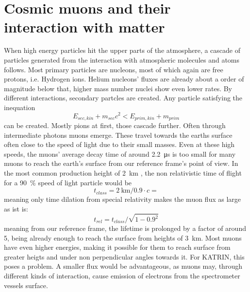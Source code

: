     \section{Cosmic muons and their interaction with matter}
    \label{ch:introduction:sec:Cosmic Air Showers}
    When high energy particles hit the upper parts of the atmosphere, a cascade of particles generated from the interaction with atmospheric molecules and atoms follows. Most primary particles are nucleons, most of which again are free protons, i.e. Hydrogen ions. Helium nucleons' fluxes are already about a order of magnitude below that, higher mass number nuclei show even lower rates\cite{highEnergyCosmicRays}. By different interactions, secondary partcles are created. Any particle satisfying the inequation \begin{equation}
      E_{sec,kin} + m_{sec} c^2 < E_{prim,kin} + m_{prim}
    \end{equation}
    can be created. Mostly pions at first, those cascade further. Often through intermediate photons muons emerge. These travel towards the earths surface often close to the speed of light due to their small masses. Even at these high speeds, the muons' average decay time of around \SI{2.2}{\micro\second} \cite{muonLifetime} is too small for many muons to reach the earth's surface from our reference frame's point of view. In the most common production height of \SI{2}{\kilo\meter} \cite{muonProductionHeight}, the non relativistic time of flight for a \SI{90}{\percent} speed of light particle would be
    \begin{equation}
	t_{class} = \SI{2}{\kilo\meter} / 0.9\cdot c = 
    \end{equation}
    meaning only time dilation from special relativity makes the muon flux as large as ist is:
    \begin{equation}
    	t_{rel} = t_{class} / \sqrt{1-0.9^2}
    \end{equation}
    meaning from our reference frame, the lifetime is prolonged by a factor of around 5, being already enough to reach the surface from heights of \SI{3}{\kilo\meter}. Most muons have even higher energies, making it possible for them to reach surface from greater heigts and under non perpendicular angles towards it.
    For KATRIN, this poses a problem. A smaller flux would be advantageous, as muons may, through different kinds of interaction, cause emission of electrons from the spectrometer vessels surface.


